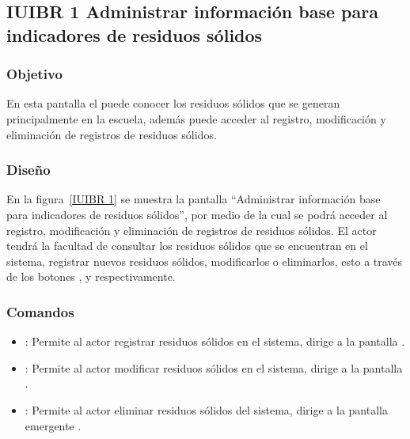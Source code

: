 \subsection{IUIBR 1 Administrar información base para indicadores de residuos sólidos}

\subsubsection{Objetivo}

    En esta pantalla el  puede conocer los residuos sólidos que se generan principalmente en la escuela, además puede acceder al registro, modificación y eliminación de registros de residuos sólidos.

\subsubsection{Diseño}

    En la figura~\ref{IUIBR 1} se muestra la pantalla ``Administrar información base para indicadores de residuos sólidos'', por medio de la cual se podrá acceder al registro, modificación y eliminación de registros de residuos sólidos. El actor tendrá la facultad de consultar los residuos sólidos que se encuentran en el sistema, registrar nuevos residuos sólidos, modificarlos o eliminarlos, esto a través de los botones , \botEdit y \botKo respectivamente.\\
    


\subsubsection{Comandos}
    \begin{itemize}
	\item {}: Permite al actor registrar residuos sólidos en el sistema, dirige a la pantalla .
	
	\item \botEdit [Modificar]: Permite al actor modificar residuos sólidos en el sistema, dirige a la pantalla .
	
	\item \botKo [Eliminar]: Permite al actor eliminar residuos sólidos del sistema, dirige a la pantalla emergente .
	
    \end{itemize}

